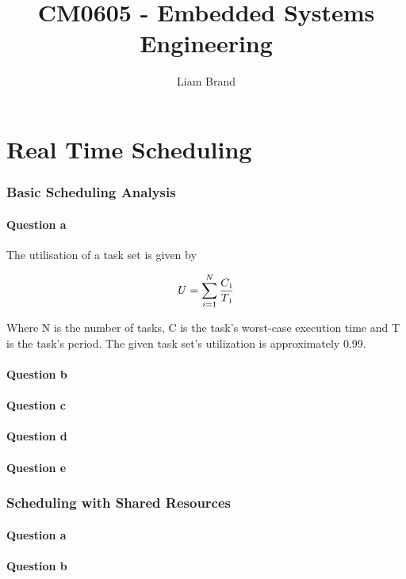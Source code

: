 \documentclass[]{report}
\title{CM0605 - Embedded Systems Engineering}
\author{Liam Brand}
\date{}
\begin{document}
\maketitle

	\chapter{Real Time Scheduling}
		\subsection{Basic Scheduling Analysis}
			\subsubsection{Question a}
			The utilisation of a task set is given by \cite{awslambdadocs}
			
			\begin{equation*}
				U = \sum_{i=1}^{N} \frac{C\textsubscript{i}}{T\textsubscript{i}}
			\end{equation*}
			
			Where N is the number of tasks, C is the task's worst-case execution time and T is the task's period. The given task set's utilization is approximately 0.99.
			
			\subsubsection{Question b}
			\subsubsection{Question c}
			\subsubsection{Question d}
			\subsubsection{Question e}
		
		\subsection{Scheduling with Shared Resources}
			\subsubsection{Question a}
			\subsubsection{Question b}
	
\end{document}
